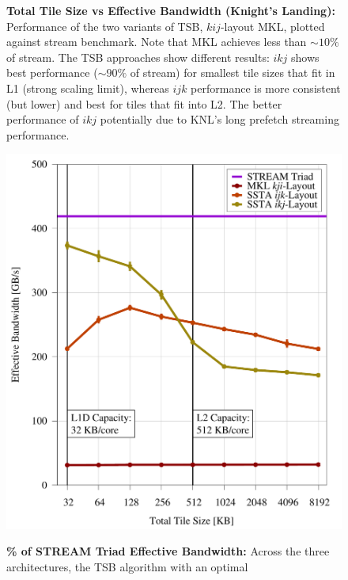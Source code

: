 \documentclass{sig-alternate-05-2015}
\begin{document}
\begin{figure}[!bth]
  \captionsetup{width=0.39\textwidth}
  \begin{minipage}{0.49\textwidth}
    \centering
    \caption{
      \textbf{Total Tile Size vs Effective Bandwidth (Knight's Landing):}
      Performance of the two variants of TSB, \(kij\)-layout MKL, plotted
      against stream benchmark. Note that MKL achieves less 
      than ${\sim}10\%$ of stream. The TSB approaches show different results: 
      \(ikj\) shows best performance (${\sim}90\%$ of stream) for smallest
      tile sizes that fit in L1 (strong scaling limit), 
      whereas \(ijk\) performance is more consistent (but lower) 
      and best for tiles that fit into L2. The better performance of 
      \(ikj\) potentially due to KNL's long prefetch streaming performance.
    }
    \label{fig:results:tile_size_knl}
    \includegraphics[width=0.95\columnwidth]{figures/post_tsb_tw_sweep_full_matrix_double_precision_production_carl_knl_7210_09_02_2016_64pus.pdf}
    \label{fig:results:tile_size_knl}
  \end{minipage}
  \begin{minipage}{0.49\textwidth}
    \centering
    \caption{
      \textbf{\% of STREAM Triad Effective Bandwidth:}
      Across the three architectures, the TSB algorithm with an optimal 
}
\end{minipage}
\end{figure}
\end{document}
